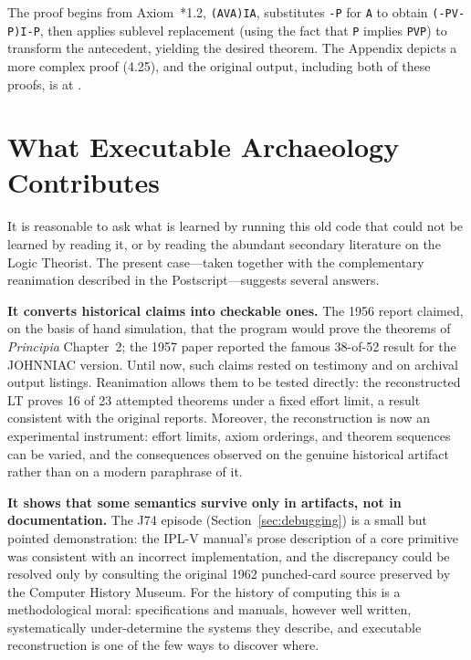 \documentclass[journal]{IEEEtran}
\begin{document}
The proof begins from Axiom~*1.2, \texttt{(AVA)IA}, substitutes
\texttt{-P} for \texttt{A} to obtain \texttt{(-PV-P)I-P}, then applies
sublevel replacement (using the fact that \texttt{P} implies
\texttt{PVP}) to transform the antecedent, yielding the desired
theorem. The Appendix depicts a more complex proof (4.25), and the
original output, including both of these proofs, is at
\cite{runoutput}.

\section{What Executable Archaeology Contributes}
\label{sec:contribution}


It is reasonable to ask what is learned by running this old code that
could not be learned by reading it, or by reading the abundant
secondary literature on the Logic Theorist. The present case---taken
together with the complementary reanimation described in the
Postscript---suggests several answers.

\textbf{It converts historical claims into checkable ones.} The 1956
report claimed, on the basis of hand simulation, that the program
would prove the theorems of \textit{Principia} Chapter~2; the 1957
paper reported the famous 38-of-52 result for the JOHNNIAC
version. Until now, such claims rested on testimony and on archival
output listings. Reanimation allows them to be tested directly: the
reconstructed LT proves 16 of 23 attempted theorems under a fixed
effort limit, a result consistent with the original
reports. Moreover, the reconstruction is now an experimental
instrument: effort limits, axiom orderings, and theorem sequences can
be varied, and the consequences observed on the genuine historical
artifact rather than on a modern paraphrase of it.

\textbf{It shows that some semantics survive only in artifacts, not
in documentation.} The J74 episode (Section~\ref{sec:debugging}) is a
small but pointed demonstration: the IPL-V manual's prose description
of a core primitive was consistent with an incorrect implementation,
and the discrepancy could be resolved only by consulting the original
1962 punched-card source preserved by the Computer History Museum.
For the history of computing this is a methodological moral:
specifications and manuals, however well written, systematically
under-determine the systems they describe, and executable
reconstruction is one of the few ways to discover where.
\end{document}
